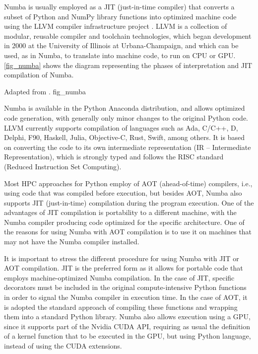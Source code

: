 Numba \cite {Marowka2018} is usually employed as a JIT (just-in-time compiler) that converts a subset of Python and NumPy library functions into optimized machine code using the LLVM compiler infrastructure project \cite {Lattner2004, Lam2015}. LLVM is a collection of modular, reusable compiler and toolchain technologies, which began development in 2000 at the University of Illinois at Urbana-Champaign, and which can be used, as in Numba, to translate into machine code, to run on CPU or GPU. \autoref {fig_numba} shows the diagram representing the phases of interpretation and JIT compilation of Numba. 

     {Adapted from .} {fig_numba}

Numba is available in the Python Anaconda distribution, and allows optimized code generation, with generally only minor changes to the original Python code. LLVM currently supports compilation of languages such as Ada, C/C++, D, Delphi, F90, Haskell, Julia, Objective-C, Rust, Swift, among others. It is based on converting the code to its own intermediate representation (IR – Intermediate Representation), which is strongly typed and follows the RISC standard (Reduced Instruction Set Computing). 

Most HPC approaches for Python employ of AOT (ahead-of-time) compilers, i.e., using code that was compiled before execution, but besides AOT, Numba also supports JIT (just-in-time) compilation during the program execution. One of the advantages of JIT compilation is portability to a different machine, with the Numba compiler producing code optimized for the specific architecture. One of the reasons for using Numba with AOT compilation is to use it on machines that may not have the Numba compiler installed. 

It is important to stress the different procedure for using Numba with JIT or AOT compilation. JIT is the preferred form as it allows for portable code that employs machine-optimized Numba compilation. In the case of JIT, specific decorators must be included in the original compute-intensive Python functions in order to signal the Numba compiler in execution time. In the case of AOT, it is adopted the standard approach of compiling these functions and wrapping them into a standard Python library. Numba also allows execution using a GPU, since it supports part of the Nvidia CUDA API, requiring as usual the definition of a kernel function that to be executed in the GPU, but using Python language, instead of using the CUDA extensions. 

